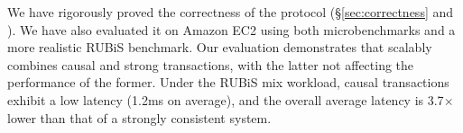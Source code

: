 We have rigorously proved the correctness of the \System protocol
(\S\ref{sec:correctness} and \tr{\ref{section:correctness-proof}}{\nappproof}).
We have also evaluated it on Amazon EC2 using both microbenchmarks and a more
realistic RUBiS benchmark. Our evaluation demonstrates that \System scalably
combines causal and strong transactions, with the latter not affecting the
performance of the former. Under the RUBiS mix workload, causal transactions
exhibit a low latency (1.2ms on average), and the overall average latency is
3.7$\times$ lower than that of a strongly consistent system.















